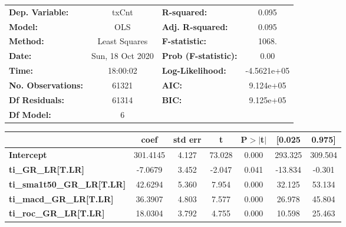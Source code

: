 \begin{center}
\begin{tabular}{lclc}
\toprule
\textbf{Dep. Variable:}                 &      txCnt       & \textbf{  R-squared:         } &      0.095   \\
\textbf{Model:}                         &       OLS        & \textbf{  Adj. R-squared:    } &      0.095   \\
\textbf{Method:}                        &  Least Squares   & \textbf{  F-statistic:       } &      1068.   \\
\textbf{Date:}                          & Sun, 18 Oct 2020 & \textbf{  Prob (F-statistic):} &      0.00    \\
\textbf{Time:}                          &     18:00:02     & \textbf{  Log-Likelihood:    } & -4.5621e+05  \\
\textbf{No. Observations:}              &       61321      & \textbf{  AIC:               } &  9.124e+05   \\
\textbf{Df Residuals:}                  &       61314      & \textbf{  BIC:               } &  9.125e+05   \\
\textbf{Df Model:}                      &           6      & \textbf{                     } &              \\
\bottomrule
\end{tabular}
\begin{tabular}{lcccccc}
                                        & \textbf{coef} & \textbf{std err} & \textbf{t} & \textbf{P$> |$t$|$} & \textbf{[0.025} & \textbf{0.975]}  \\
\midrule
\textbf{Intercept}                      &     301.4145  &        4.127     &    73.028  &         0.000        &      293.325    &      309.504     \\
\textbf{ti\_GR\_LR[T.LR]}               &      -7.0679  &        3.452     &    -2.047  &         0.041        &      -13.834    &       -0.301     \\
\textbf{ti\_sma1t50\_GR\_LR[T.LR]}      &      42.6294  &        5.360     &     7.954  &         0.000        &       32.125    &       53.134     \\
\textbf{ti\_macd\_GR\_LR[T.LR]}         &      36.3907  &        4.803     &     7.577  &         0.000        &       26.978    &       45.804     \\
\textbf{ti\_roc\_GR\_LR[T.LR]}          &      18.0304  &        3.792     &     4.755  &         0.000        &       10.598    &       25.463     \\

\end{tabular}
\end{center}

